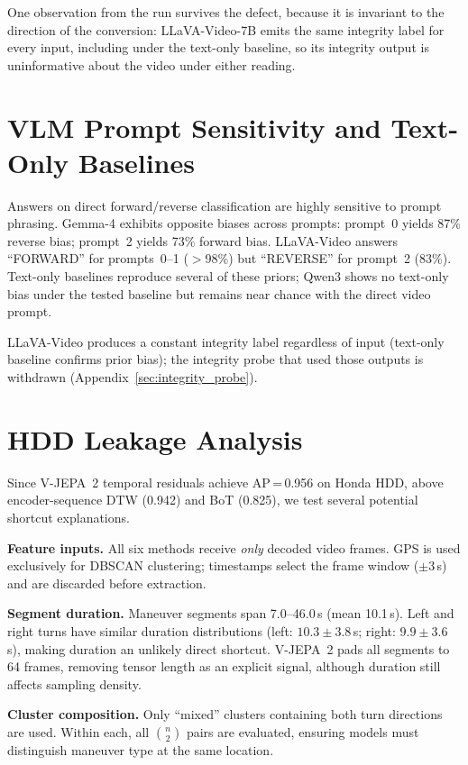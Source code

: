 \documentclass{article}
\theoremstyle{remark}
\begin{document}
One observation from the run survives the defect, because it is invariant to the direction of the conversion: LLaVA-Video-7B emits the same integrity label for every input, including under the text-only baseline, so its integrity output is uninformative about the video under either reading.

\section{VLM Prompt Sensitivity and Text-Only Baselines}
\label{sec:prompt_details}

Answers on direct forward/reverse classification are highly sensitive to prompt phrasing. Gemma-4 exhibits opposite biases across prompts: prompt~0 yields 87\% reverse bias; prompt~2 yields 73\% forward bias. LLaVA-Video answers ``FORWARD'' for prompts~0--1 ($>$98\%) but ``REVERSE'' for prompt~2 (83\%). Text-only baselines reproduce several of these priors; Qwen3 shows no text-only bias under the tested baseline but remains near chance with the direct video prompt.

LLaVA-Video produces a constant integrity label regardless of input (text-only baseline confirms prior bias); the integrity probe that used those outputs is withdrawn (Appendix~\ref{sec:integrity_probe}).

\section{HDD Leakage Analysis}
\label{sec:hdd_leakage}

Since V-JEPA~2 temporal residuals achieve AP\,=\,0.956 on Honda HDD, above encoder-sequence DTW (0.942) and BoT (0.825), we test several potential shortcut explanations.

\textbf{Feature inputs.} All six methods receive \emph{only} decoded video frames. GPS is used exclusively for DBSCAN clustering; timestamps select the frame window ($\pm$3\,s) and are discarded before extraction.

\textbf{Segment duration.} Maneuver segments span 7.0--46.0\,s (mean 10.1\,s). Left and right turns have similar duration distributions (left: $10.3 \pm 3.8$\,s; right: $9.9 \pm 3.6$\,s), making duration an unlikely direct shortcut. V-JEPA~2 pads all segments to 64 frames, removing tensor length as an explicit signal, although duration still affects sampling density.

\textbf{Cluster composition.} Only ``mixed'' clusters containing both turn directions are used. Within each, all $\binom{n}{2}$ pairs are evaluated, ensuring models must distinguish maneuver type at the same location.
\end{document}
